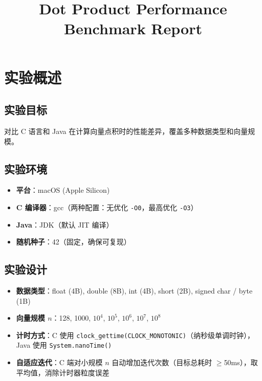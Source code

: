 \documentclass[12pt,a4paper]{article}
\title{\textbf{Dot Product Performance Benchmark Report}}
\author{}
\date{}
\begin{document}
\maketitle

\section{实验概述}

\subsection{实验目标}

对比 C 语言和 Java 在计算向量点积时的性能差异，覆盖多种数据类型和向量规模。

\subsection{实验环境}

\begin{itemize}
  \item \textbf{平台}：macOS (Apple Silicon)
  \item \textbf{C 编译器}：gcc（两种配置：无优化 \texttt{-O0}，最高优化 \texttt{-O3}）
  \item \textbf{Java}：JDK（默认 JIT 编译）
  \item \textbf{随机种子}：42（固定，确保可复现）
\end{itemize}

\subsection{实验设计}

\begin{itemize}
  \item \textbf{数据类型}：float (4B), double (8B), int (4B), short (2B), signed char / byte (1B)
  \item \textbf{向量规模 $n$}：128, 1000, $10^4$, $10^5$, $10^6$, $10^7$, $10^8$
  \item \textbf{计时方式}：C 使用 \texttt{clock\_gettime(CLOCK\_MONOTONIC)}（纳秒级单调时钟），Java 使用 \texttt{System.nanoTime()}
  \item \textbf{自适应迭代}：C 端对小规模 $n$ 自动增加迭代次数（目标总耗时 $\geq$50ms），取平均值，消除计时器粒度误差
\end{itemize}
\end{document}
